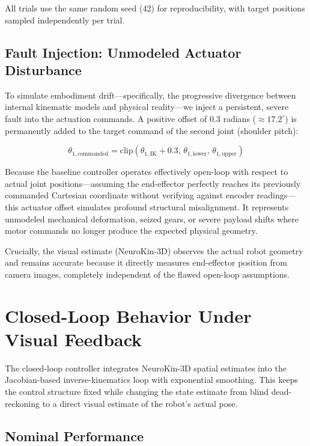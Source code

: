 \documentclass[12pt,a4paper,oneside]{report}
\begin{document}
All trials use the same random seed (42) for reproducibility, with target positions sampled independently per trial.

\subsection{Fault Injection: Unmodeled Actuator Disturbance}

To simulate embodiment drift—specifically, the progressive divergence between internal kinematic models and physical reality—we inject a persistent, severe fault into the actuation commands. A positive offset of 0.3 radians ($\approx 17.2^\circ$) is permanently added to the target command of the second joint (shoulder pitch):

\begin{equation}
\theta_{1,\text{commanded}} = \text{clip}(\theta_{1,\text{IK}} + 0.3, \, \theta_{1,\text{lower}}, \, \theta_{1,\text{upper}})
\end{equation}

Because the baseline controller operates effectively open-loop with respect to actual joint positions—assuming the end-effector perfectly reaches its previously commanded Cartesian coordinate without verifying against encoder readings—this actuator offset simulates profound structural misalignment. It represents unmodeled mechanical deformation, seized gears, or severe payload shifts where motor commands no longer produce the expected physical geometry.

Crucially, the visual estimate (NeuroKin-3D) observes the actual robot geometry and remains accurate because it directly measures end-effector position from camera images, completely independent of the flawed open-loop assumptions.

\section{Closed-Loop Behavior Under Visual Feedback}

The closed-loop controller integrates NeuroKin-3D spatial estimates into the Jacobian-based inverse-kinematics loop with exponential smoothing. This keeps the control structure fixed while changing the state estimate from blind dead-reckoning to a direct visual estimate of the robot's actual pose.

\subsection{Nominal Performance}
\end{document}
